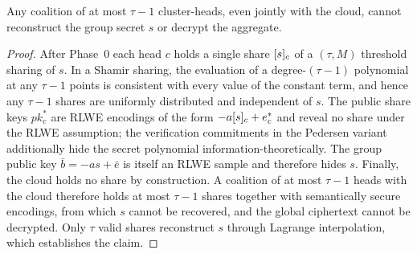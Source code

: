 \begin{theorem}
\label{thm:key}
Any coalition of at most $\tau-1$ cluster-heads, even jointly with the cloud, cannot reconstruct the group secret $s$ or decrypt the aggregate.
\end{theorem}
\begin{proof}
After Phase~0 each head $c$ holds a single share $[s]_{c}$ of a $( \tau, M)$ threshold sharing of $s$. In a Shamir sharing, the evaluation of a degree-$(\tau-1)$ polynomial at any $\tau-1$ points is consistent with every value of the constant term, and hence any $\tau-1$ shares are uniformly distributed and independent of $s$. The public share keys $pk_c^*$ are RLWE encodings of the form $-a[s]_{c}+e_c^*$ and reveal no share under the RLWE assumption; the verification commitments in the Pedersen variant additionally hide the secret polynomial information-theoretically. The group public key $\bar b=-as+\bar e$ is itself an RLWE sample and therefore hides $s$. Finally, the cloud holds no share by construction. A coalition of at most $\tau-1$ heads with the cloud therefore holds at most $\tau-1$ shares together with semantically secure encodings, from which $s$ cannot be recovered, and the global ciphertext cannot be decrypted. Only $\tau$ valid shares reconstruct $s$ through Lagrange interpolation, which establishes the claim.
\end{proof}

